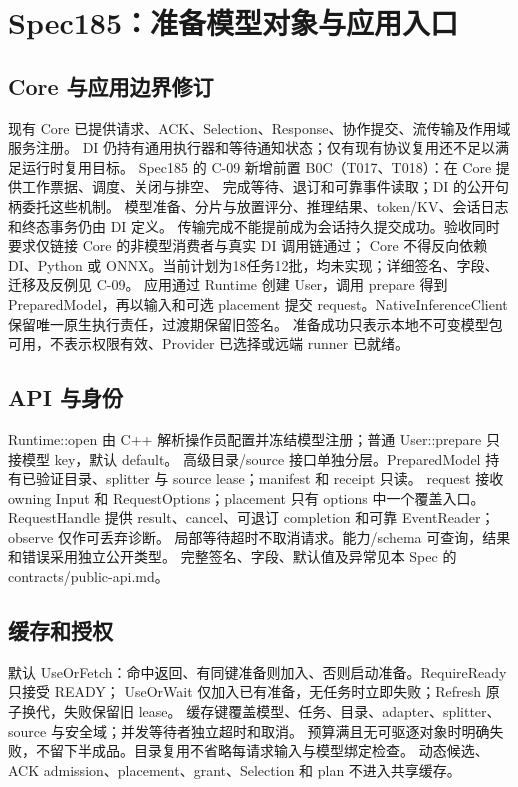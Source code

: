 \clearpage
\section{Spec185：准备模型对象与应用入口}

\subsection{Core 与应用边界修订}
现有 Core 已提供请求、ACK、Selection、Response、协作提交、流传输及作用域服务注册。
DI 仍持有通用执行器和等待通知状态；仅有现有协议复用还不足以满足运行时复用目标。
Spec185 的 C-09 新增前置 B0C（T017、T018）：在 Core 提供工作票据、调度、关闭与排空、
完成等待、退订和可靠事件读取；DI 的公开句柄委托这些机制。
模型准备、分片与放置评分、推理结果、token/KV、会话日志和终态事务仍由 DI 定义。
传输完成不能提前成为会话持久提交成功。验收同时要求仅链接 Core 的非模型消费者与真实 DI 调用链通过；
Core 不得反向依赖 DI、Python 或 ONNX。当前计划为18任务12批，均未实现；详细签名、字段、迁移及反例见 C-09。
应用通过 Runtime 创建 User，调用 prepare 得到 PreparedModel，再以输入和可选 placement
提交 request。NativeInferenceClient 保留唯一原生执行责任，过渡期保留旧签名。
准备成功只表示本地不可变模型包可用，不表示权限有效、Provider 已选择或远端 runner 已就绪。

\subsection{API 与身份}
Runtime::open 由 C++ 解析操作员配置并冻结模型注册；普通 User::prepare 只接模型 key，默认 default。
高级目录/source 接口单独分层。PreparedModel 持有已验证目录、splitter 与 source lease；manifest 和 receipt 只读。
request 接收 owning Input 和 RequestOptions；placement 只有 options 中一个覆盖入口。
RequestHandle 提供 result、cancel、可退订 completion 和可靠 EventReader；observe 仅作可丢弃诊断。
局部等待超时不取消请求。能力/schema 可查询，结果和错误采用独立公开类型。
完整签名、字段、默认值及异常见本 Spec 的 contracts/public-api.md。

\subsection{缓存和授权}
默认 UseOrFetch：命中返回、有同键准备则加入、否则启动准备。RequireReady 只接受 READY；
UseOrWait 仅加入已有准备，无任务时立即失败；Refresh 原子换代，失败保留旧 lease。
缓存键覆盖模型、任务、目录、adapter、splitter、source 与安全域；并发等待者独立超时和取消。
预算满且无可驱逐对象时明确失败，不留下半成品。目录复用不省略每请求输入与模型绑定检查。
动态候选、ACK admission、placement、grant、Selection 和 plan 不进入共享缓存。

